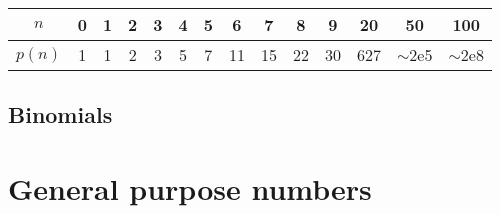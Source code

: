 		\begin{center}
		\begin{tabular}{c|c@{\ }c@{\ }c@{\ }c@{\ }c@{\ }c@{\ }c@{\ }c@{\ }c@{\ }c@{\ }c@{\ }c@{\ }c}
			$n$    & 0 & 1 & 2 & 3 & 4 & 5 & 6  & 7  & 8  & 9  & 20  & 50  & 100 \\ \hline
			$p(n)$ & 1 & 1 & 2 & 3 & 5 & 7 & 11 & 15 & 22 & 30 & 627 & $\mathtt{\sim}$2e5 & $\mathtt{\sim}$2e8 \\
		\end{tabular}
		\end{center}


	\subsection{Binomials}

\section{General purpose numbers}




